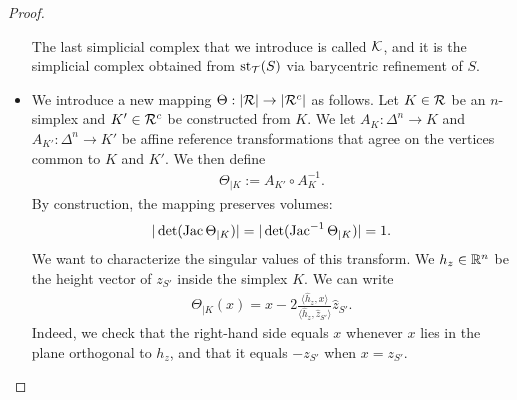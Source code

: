 \documentclass[10pt,a4paper]{article}
\begin{document}
\begin{proof}
\begin{itemize}
        The last simplicial complex that we introduce is called ${\mathcal K}$,
        and it is the simplicial complex obtained from $\operatorname{st}_{{\mathcal T}}(S)$ via barycentric refinement of $S$. 
        
                
        \item 
        We introduce a new mapping $\Theta : |{\mathcal R}| \rightarrow |{\mathcal R}^c|$ as follows.
        Let $K \in {\mathcal R}$ be an $n$-simplex and $K' \in {\mathcal R}^{c}$ be constructed from $K$.
        We let $A_{K} : \Delta^{n} \rightarrow K$ and $A_{K'} : \Delta^{n} \rightarrow K'$
        be affine reference transformations
        that agree on the vertices common to $K$ and $K'$.
        We then define 
        \begin{align*}
            \Theta_{|K} := A_{K'} \circ A_{K}^{-1}.
        \end{align*}
        By construction, the mapping preserves volumes:
        \begin{align*}
            |\det( \operatorname{{\rm Jac}}      \Theta_{|K} )|
            = 
            |\det( \operatorname{{\rm Jac}}^{-1} \Theta_{|K} )|
            =
            1
            .
        \end{align*}
        We want to characterize the singular values of this transform. 
        We $h_{z} \in {\mathbb R}^{n}$ be the height vector of $z_{S'}$ inside the simplex $K$.
        We can write
        \begin{align*}
            \Theta_{|K}(x) 
            = 
            x
            - 
            2 \frac{\langle \hat h_{z}, x \rangle}{\langle \hat h_{z}, \hat z_{S'} \rangle}
            \hat z_{S'}
            .
        \end{align*}
        Indeed, we check that the right-hand side equals $x$ whenever $x$ lies in the plane orthogonal to $h_{z}$,
        and that it equals $-z_{S'}$ when $x = z_{S'}$.

\end{itemize}
\end{proof}
\end{document}
